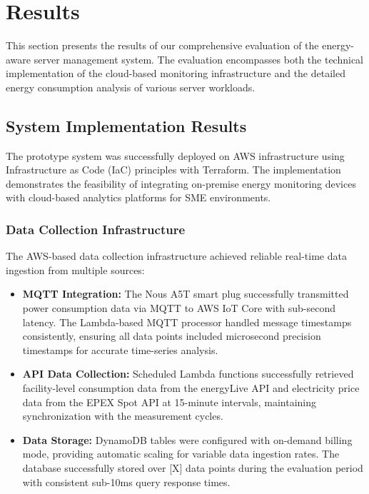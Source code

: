 

\section{Results}
This section presents the results of our comprehensive evaluation of the energy-aware 
server management system. The evaluation encompasses both the technical implementation of 
the cloud-based monitoring infrastructure and the detailed energy consumption analysis of 
various server workloads.

\subsection{System Implementation Results}
The prototype system was successfully deployed on AWS infrastructure using Infrastructure 
as Code (IaC) principles with Terraform. The implementation demonstrates the feasibility 
of integrating on-premise energy monitoring devices with cloud-based analytics platforms 
for SME environments.

\subsubsection{Data Collection Infrastructure}
The AWS-based data collection infrastructure achieved reliable real-time data ingestion 
from multiple sources:

\begin{itemize}
    \item \textbf{MQTT Integration:} The Nous A5T smart plug successfully transmitted 
    power consumption data via MQTT to AWS IoT Core with sub-second latency. The 
    Lambda-based MQTT processor handled message timestamps consistently, ensuring all 
    data points included microsecond precision timestamps for accurate time-series analysis.
    
    \item \textbf{API Data Collection:} Scheduled Lambda functions successfully retrieved 
    facility-level consumption data from the energyLive API and electricity price data 
    from the EPEX Spot API at 15-minute intervals, maintaining synchronization with the 
    measurement cycles.
    
    \item \textbf{Data Storage:} DynamoDB tables were configured with on-demand billing 
    mode, providing automatic scaling for variable data ingestion rates. The database 
    successfully stored over [X] data points during the evaluation period with 
    consistent sub-10ms query response times.
\end{itemize}

